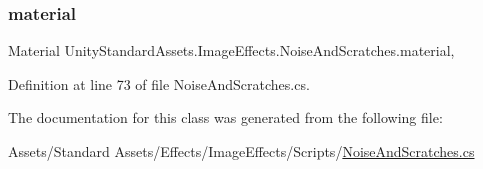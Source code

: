 \subsubsection{\texorpdfstring{material}{material}}
{\footnotesize\ttfamily Material Unity\+Standard\+Assets.\+Image\+Effects.\+Noise\+And\+Scratches.\+material\hspace{0.3cm}{\ttfamily [get]}, {\ttfamily [protected]}}



Definition at line 73 of file Noise\+And\+Scratches.\+cs.



The documentation for this class was generated from the following file\+:\begin{DoxyCompactItemize}
\item 
Assets/\+Standard Assets/\+Effects/\+Image\+Effects/\+Scripts/\mbox{\hyperlink{_noise_and_scratches_8cs}{Noise\+And\+Scratches.\+cs}}\end{DoxyCompactItemize}
